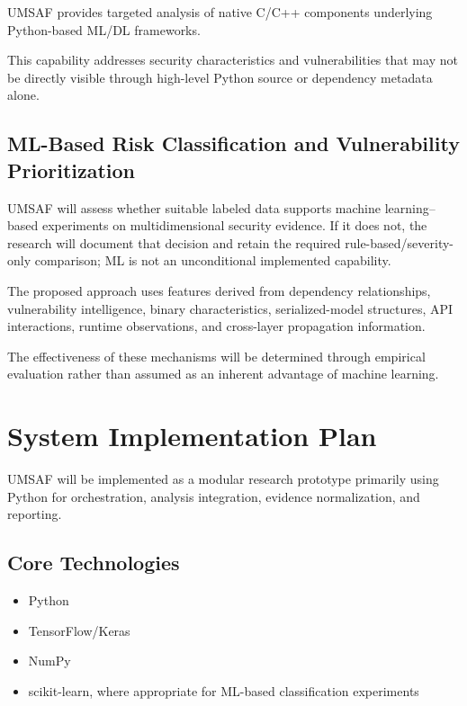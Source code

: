 \documentclass[
  12pt,
  letterpaper,
  oneside]{report}
\providecommand{\tightlist}{%
  \setlength{\itemsep}{0pt}\setlength{\parskip}{0pt}}
\begin{document}
UMSAF provides targeted analysis of native C/C++ components underlying
Python-based ML/DL frameworks.

This capability addresses security characteristics and vulnerabilities
that may not be directly visible through high-level Python source or
dependency metadata alone.

\subsection{ML-Based Risk Classification and Vulnerability Prioritization}\label{1057-ml-based-risk-classification-and-vulnerability-prioritization}

UMSAF will assess whether suitable labeled data supports machine
learning--based experiments on multidimensional security evidence. If it
does not, the research will document that decision and retain the
required rule-based/severity-only comparison; ML is not an unconditional
implemented capability.

The proposed approach uses features derived from dependency
relationships, vulnerability intelligence, binary characteristics,
serialized-model structures, API interactions, runtime observations, and
cross-layer propagation information.

The effectiveness of these mechanisms will be determined through
empirical evaluation rather than assumed as an inherent advantage of
machine learning.

\section{System Implementation Plan}\label{106-system-implementation-plan}

UMSAF will be implemented as a modular research prototype primarily
using Python for orchestration, analysis integration, evidence
normalization, and reporting.

\subsection{Core Technologies}\label{core-technologies}

\begin{itemize}
\tightlist
\item
  Python
\item
  TensorFlow/Keras
\item
  NumPy
\item
  scikit-learn, where appropriate for ML-based classification
  experiments
\end{itemize}
\end{document}
